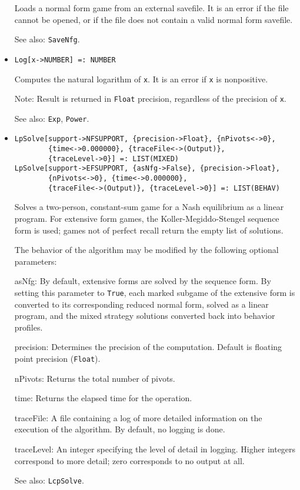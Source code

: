 \begin{itemize}
\bd
Loads a normal form game from an external savefile.
It is an error if the file cannot be opened, or if the file does not 
contain a valid normal form savefile.
\item [See also:] \verb+SaveNfg+.
\ed

\item{}
\protect \large \begin{verbatim}
Log[x->NUMBER] =: NUMBER 
\end{verbatim} \normalsize

\bd
Computes the natural logarithm of \verb+x+.  It is an error if
\verb+x+ is nonpositive.
\item [Note:] Result is returned in \verb+Float+ precision, regardless of
the precision of \verb+x+.
\item [See also:] \verb+Exp+, \verb+Power+.
\ed

\item{}
\protect \large \begin{verbatim}
LpSolve[support->NFSUPPORT, {precision->Float}, {nPivots<->0}, 
        {time<->0.000000}, {traceFile<->(Output)}, 
        {traceLevel->0}] =: LIST(MIXED) 
LpSolve[support->EFSUPPORT, {asNfg->False}, {precision->Float}, 
        {nPivots<->0}, {time<->0.000000}, 
        {traceFile<->(Output)}, {traceLevel->0}] =: LIST(BEHAV) 
\end{verbatim}\normalsize

\bd
Solves a two-person, constant-sum game for a Nash equilibrium as a linear
program.  For extensive form games, the Koller-Megiddo-Stengel
sequence form is used; games not of perfect recall return the empty
list of solutions.

The behavior of the algorithm may be modified by the following optional
parameters:
\bd
\item
[asNfg:] By default, extensive forms are solved by the sequence form.
By setting this parameter to \verb+True+, each marked subgame of the
extensive form is converted to its corresponding reduced normal form,
solved as a linear program, and the mixed strategy solutions converted back
into behavior profiles.
\item
[precision:] Determines the precision of the computation. Default is
floating point precision (\verb+Float+). 
\item
[nPivots:] Returns the total number of pivots.
\item
[time:] Returns the elapsed time for the operation.
\item
[traceFile:] A file containing a log of more detailed information on the
execution of the algorithm.  By default, no logging is done.
\item
[traceLevel:] An integer specifying the level of detail in logging.
Higher integers correspond to more detail; zero corresponds to no
output at all.
\ed
\item [See also:] \verb+LcpSolve+.
\ed


\end{itemize}
